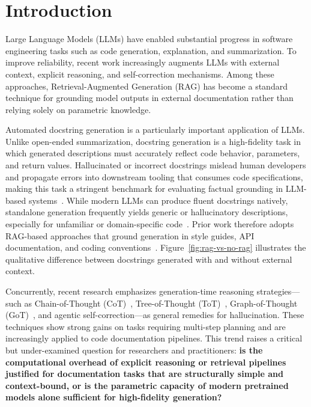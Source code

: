 \documentclass[pdflatex,sn-mathphys-ay]{sn-jnl}%
\theoremstyle{thmstyleone}%
\theoremstyle{thmstyletwo}%
\theoremstyle{thmstylethree}%
\begin{document}

\maketitle

\section{Introduction}
\label{intro}
Large Language Models (LLMs) have enabled substantial progress in software engineering tasks such as code generation, explanation, and summarization. To improve reliability, recent work increasingly augments LLMs with external context, explicit reasoning, and self-correction mechanisms. Among these approaches, Retrieval-Augmented Generation (RAG) has become a standard technique for grounding model outputs in external documentation rather than relying solely on parametric knowledge.

Automated docstring generation is a particularly important application of LLMs. Unlike open-ended summarization, docstring generation is a high-fidelity task in which generated descriptions must accurately reflect code behavior, parameters, and return values. Hallucinated or incorrect docstrings mislead human developers and propagate errors into downstream tooling that consumes code specifications, making this task a stringent benchmark for evaluating factual grounding in LLM-based systems~\cite{CanDR,gireesh}. While modern LLMs can produce fluent docstrings natively, standalone generation frequently yields generic or hallucinatory descriptions, especially for unfamiliar or domain-specific code~\cite{beyond}. Prior work therefore adopts RAG-based approaches that ground generation in style guides, API documentation, and coding conventions~\cite{codereview}. Figure~\ref{fig:rag-vs-no-rag} illustrates the qualitative difference between docstrings generated with and without external context.

Concurrently, recent research emphasizes generation-time reasoning strategies---such as Chain-of-Thought (CoT)~\cite{cot}, Tree-of-Thought (ToT)~\cite{tot}, Graph-of-Thought (GoT)~\cite{got}, and agentic self-correction---as general remedies for hallucination. These techniques show strong gains on tasks requiring multi-step planning and are increasingly applied to code documentation pipelines. This trend raises a critical but under-examined question for researchers and practitioners: \textbf{is the computational overhead of explicit reasoning or retrieval pipelines justified for documentation tasks that are structurally simple and context-bound, or is the parametric capacity of modern pretrained models alone sufficient for high-fidelity generation?}
\end{document}
